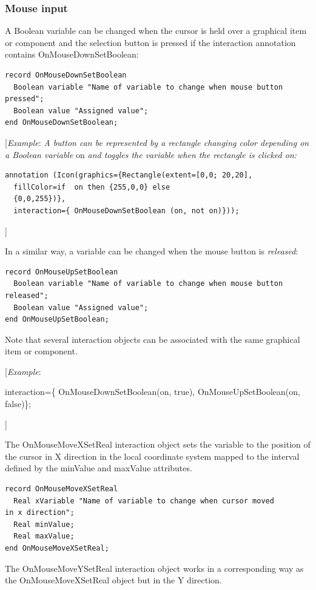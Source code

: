 \documentclass[10pt,a4paper]{report}
\def\doublelabel#1{\label{#1}\hypertarget{#1}{}}
\begin{document}
\subsubsection{Mouse input}\doublelabel{mouse-input}

A Boolean variable can be changed when the cursor is held over a
graphical item or component and the selection button is pressed if the
interaction annotation contains OnMouseDownSetBoolean:

\begin{lstlisting}[language=modelica]
record OnMouseDownSetBoolean
  Boolean variable "Name of variable to change when mouse button pressed";
  Boolean value "Assigned value";
end OnMouseDownSetBoolean;
\end{lstlisting}
{[}\emph{Example}: \emph{A button can be represented by a rectangle
changing color depending on a Boolean variable} on \emph{and toggles the
variable when the rectangle is clicked on:}

\begin{lstlisting}[language=modelica]
  annotation (Icon(graphics={Rectangle(extent=[0,0; 20,20],
  fillColor=if  on then {255,0,0} else
  {0,0,255})},
  interaction={ OnMouseDownSetBoolean (on, not on)}));
\end{lstlisting}
{]}

In a similar way, a variable can be changed when the mouse button is
\emph{released}:

\begin{lstlisting}[language=modelica]
record OnMouseUpSetBoolean
  Boolean variable "Name of variable to change when mouse button
released";
  Boolean value "Assigned value";
end OnMouseUpSetBoolean;
\end{lstlisting}
Note that several interaction objects can be associated with the same
graphical item or component.

{[}\emph{Example}:

interaction=\{ OnMouseDownSetBoolean(on, true), OnMouseUpSetBoolean(on,
false)\};

{]}

The OnMouseMoveXSetReal interaction object sets the variable to the
position of the cursor in X direction in the local coordinate system
mapped to the interval defined by the minValue and maxValue attributes.

\begin{lstlisting}[language=modelica]
record OnMouseMoveXSetReal
  Real xVariable "Name of variable to change when cursor moved
in x direction";
  Real minValue;
  Real maxValue;
end OnMouseMoveXSetReal;
\end{lstlisting}
The OnMouseMoveYSetReal interaction object works in a corresponding way
as the OnMouseMoveXSetReal object but in the Y direction.
\end{document}
